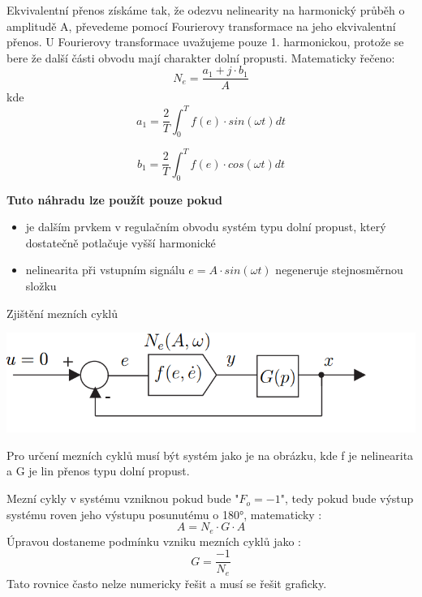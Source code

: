 Ekvivalentní přenos získáme  tak, že odezvu nelinearity na harmonický průběh o amplitudě A, převedeme pomocí Fourierovy transformace na jeho ekvivalentní přenos. U Fourierovy transformace uvažujeme pouze 1. harmonickou,
protože se bere že další části obvodu mají charakter dolní propusti. Matematicky řečeno:
\begin{equation*}
    N_e= \frac{a_1+j\cdot b_1}{A}
\end{equation*}
kde
\begin{equation*}
    a_1=\frac{2}{T} \int_{0}^{T} f(e) \cdot sin(\omega t) dt
\end{equation*}

\begin{equation*}
    b_1=\frac{2}{T} \int_{0}^{T} f(e) \cdot cos(\omega t) dt
\end{equation*}

{\bf Tuto náhradu lze použít pouze pokud}
\begin{itemize}
    \item je dalším prvkem v regulačním obvodu systém typu dolní propust, který dostatečně potlačuje vyšší harmonické
    \item nelinearita při vstupním signálu $e=A\cdot sin (\omega t) $ negeneruje stejnosměrnou složku
\end{itemize}

Zjištění mezních cyklů

\includegraphics[scale = 0.5]{img/harm.rovnovha.png}

Pro určení mezních cyklů musí být systém jako je na obrázku, kde f je nelinearita a G je lin přenos typu dolní propust.

Mezní cykly v systému vzniknou pokud bude "$ F_o =-1 $", tedy pokud bude výstup systému
roven jeho výstupu posunutému o 180°, matematicky :
\begin{equation*}
    A= N_e \cdot G \cdot A
\end{equation*}
Úpravou dostaneme podmínku vzniku mezních cyklů jako :
\begin{equation*}
    G=\frac{-1}{N_e}
\end{equation*}
Tato rovnice často nelze numericky řešit a musí se řešit graficky.


